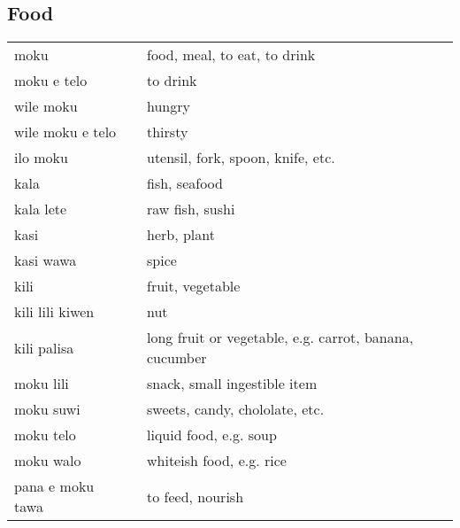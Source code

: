 \subsection{Food}
%
\begin{supertabular}{p{4,5cm}|ll}
    moku                            &  & food, meal, to eat, to drink                           \\
    moku e telo                     &  & to drink                                               \\
    wile moku                       &  & hungry                                                 \\
    wile moku e telo                &  & thirsty                                                \\
    ilo moku                        &  & utensil, fork, spoon, knife, etc.                      \\
    kala                            &  & fish, seafood                                          \\
    kala lete                       &  & raw fish, sushi                                        \\
    kasi                            &  & herb, plant                                            \\
    kasi wawa                       &  & spice                                                  \\
    kili                            &  & fruit, vegetable                                       \\
    kili lili kiwen                 &  & nut                                                    \\
    kili palisa                     &  & long fruit or vegetable, e.g. carrot, banana, cucumber \\
    moku lili                       &  & snack, small ingestible item                           \\
    moku suwi                       &  & sweets, candy, chololate, etc.                         \\
    moku telo                       &  & liquid food, e.g. soup                                 \\
    moku walo                       &  & whiteish food, e.g. rice                               \\
    pana e moku tawa                &  & to feed, nourish                                       \\

\end{supertabular}
